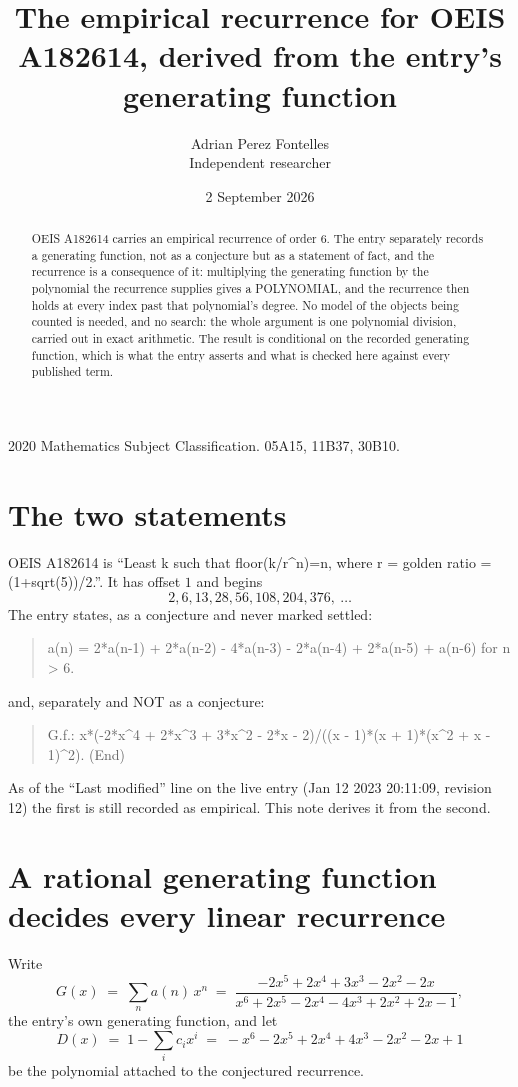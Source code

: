 \documentclass[11pt,a4paper]{article}
\title{The empirical recurrence for OEIS A182614, derived from the entry's generating function}
\author{Adrian Perez Fontelles\\ \small Independent researcher}
\date{2 September 2026}
\theoremstyle{plain}
\theoremstyle{definition}
\begin{document}
\maketitle

\begin{abstract}
OEIS A182614 carries an empirical recurrence of order $6$. The entry separately records a
generating function, not as a conjecture but as a statement of fact, and the recurrence is a
consequence of it: multiplying the generating function by the polynomial the recurrence
supplies gives a POLYNOMIAL, and the recurrence then holds at every index past that
polynomial's degree. No model of the objects being counted is needed, and no search: the
whole argument is one polynomial division, carried out in exact arithmetic. The result is
conditional on the recorded generating function, which is what the entry asserts and what is
checked here against every published term.
\end{abstract}

\noindent\small 2020 Mathematics Subject Classification. 05A15, 11B37, 30B10.\normalsize

\section{The two statements}

OEIS A182614 is ``Least k such that floor(k/r\^{}n)=n, where r = golden ratio = (1+sqrt(5))/2.''. It has offset $1$ and begins
\[
2, 6, 13, 28, 56, 108, 204, 376,\ \dots
\]
The entry states, as a conjecture and never marked settled:
\begin{quote}
a(n) = 2*a(n-1) + 2*a(n-2) - 4*a(n-3) - 2*a(n-4) + 2*a(n-5) + a(n-6) for n > 6.
\end{quote}
and, separately and NOT as a conjecture:
\begin{quote}
G.f.: x*(-2*x\^{}4 + 2*x\^{}3 + 3*x\^{}2 - 2*x - 2)/((x - 1)*(x + 1)*(x\^{}2 + x - 1)\^{}2). (End)
\end{quote}
As of the ``Last modified'' line on the live entry (Jan 12 2023 20:11:09, revision 12) the first is still
recorded as empirical. This note derives it from the second.

\section{A rational generating function decides every linear recurrence}

Write
\[
G(x)\;=\;\sum_{n}a(n)\,x^{n}\;=\;\frac{- 2 x^{5} + 2 x^{4} + 3 x^{3} - 2 x^{2} - 2 x}{x^{6} + 2 x^{5} - 2 x^{4} - 4 x^{3} + 2 x^{2} + 2 x - 1},
\]
the entry's own generating function, and let
\[
D(x)\;=\;1-\sum_i c_i x^{i}\;=\;- x^{6} - 2 x^{5} + 2 x^{4} + 4 x^{3} - 2 x^{2} - 2 x + 1
\]
be the polynomial attached to the conjectured recurrence.
\end{document}
